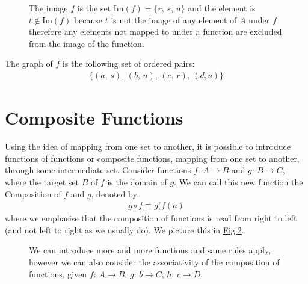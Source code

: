 \documentclass[letterpaper,10pt,english]{jupyterBook}
\begin{document}
\begin{figure}[htbp]
\centering
\capstart

\noindent{}
\caption{The image \(f\) is the set \(\text{Im}(f) = \{r,\,s,\,u\}\) and the element is \(t \notin \text{Im}(f)\) because \(t\) is not the image of any
element of \(A\) under \(f\) \sphinxhyphen{} therefore any elements not mapped to under a function are excluded from the image of the function.}\label{\detokenize{ProofLogic/functions:functionimage}}\end{figure}

\sphinxAtStartPar
The graph of \(f\) is the following set of ordered pairs:
\begin{equation*}
\begin{split}\{ (a,\,s),\,(b,\,u),\,(c,\,r),\,(d,s) \}\end{split}
\end{equation*}

\section{Composite Functions}
\label{\detokenize{ProofLogic/functions:composite-functions}}
\sphinxAtStartPar
Using the idea of mapping from one set to another, it is possible to introduce functions of functions or composite functions, mapping from one set to another, through
some intermediate set.  Consider functions \(f:\,A \rightarrow B\) and \(g:\,B \rightarrow C\), where the target set \(B\) of \(f\) is the domain of \(g\).  We can call this new function
the Composition of \(f\) and \(g\), denoted by:
\begin{equation*}
\begin{split}g \circ f \equiv g(f(a)\end{split}
\end{equation*}
\sphinxAtStartPar
where we emphasise that the composition of functions is read from right to left (and not left to right as we usually do).  We picture this in \hyperref[\detokenize{ProofLogic/functions:compositefunction}]{Fig.\@ \ref{\detokenize{ProofLogic/functions:compositefunction}}}.

\begin{figure}[htbp]
\centering
\capstart

\noindent{}
\caption{We can introduce more and more functions and same rules apply, however we can also consider the associativity of the composition of functions, given
\(f:\,A \rightarrow B,\,g:\, b \rightarrow C,\,h:\,c \rightarrow D\).}\label{\detokenize{ProofLogic/functions:compositefunction}}\end{figure}
\end{document}
